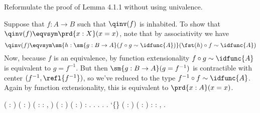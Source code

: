 Reformulate the proof of Lemma 4.1.1 without using univalence.


 \soln
Suppose that $f : A \to B$ such that $\qinv(f)$ is inhabited.  To show that
$\qinv(f) \eqvsym \prd{x:X}(x=x)$, note that by associativity we have
\[
  \qinv(f) \eqvsym 
  \sm{h : \sm{g : B \to A}(f \circ g \sim \idfunc{A})}
    (\fst(h) \circ f \sim \idfunc{A})
\]
Now, because $f$ is an equivalence, by function extensionality $f \circ g \sim
\idfunc{A}$ is equivalent to $g = f^{-1}$.  But then $\sm{g : B \to A}(g =
f^{-1})$ is contractible with center $(f^{-1}, \refl{f^{-1}})$, so we've
reduced to the type $f^{-1} \circ f \sim \idfunc{A}$.  Again by function
extensionality, this is equivalent to $\prd{x:A}(x=x)$.
\begin{coqdoccode}
\coqdocemptyline
\coqdocnoindent
{}  (  : ) (  :   ) ( : \coqdockw{\ensuremath{\forall}}  : ,   \coqdocnotation{=}  )\coqdoceol
\coqdocindent{4.50em}
(  : ) ( :  \coqdocnotation{=} )\coqdoceol
\coqdocindent{1.00em}
:     \coqdocnotation{=}        \coqdocnotation{(} \coqdocnotation{)\^{}}.\coqdoceol
\coqdocnoindent
{}.\coqdoceol
\coqdocindent{1.00em}
 .  .\coqdoceol
\coqdocnoindent
{}.\coqdoceol
\coqdocemptyline
\coqdocnoindent
{}  `\{\} (  : ) ( :  \coqdocnotation{\ensuremath{\eqvsym}} ) :\coqdoceol
\coqdocindent{1.00em}
  \coqdocnotation{\ensuremath{\eqvsym}} \coqdockw{\ensuremath{\forall}}  : ,  \coqdocnotation{=} .\coqdoceol

\end{coqdoccode}
